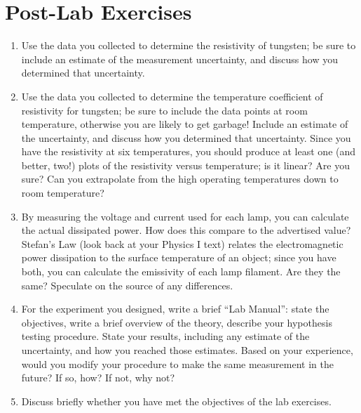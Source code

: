 \documentclass[12pt]{article}
\begin{document}
\section*{Post-Lab Exercises}

\begin{enumerate}
\item Use the data you collected to determine the resistivity of
  tungsten; be sure to include an estimate of the measurement
  uncertainty, and discuss how you determined that uncertainty.
\item Use the data you collected to determine the temperature
  coefficient of resistivity for tungsten; be sure to include the data
  points at room temperature, otherwise you are likely to get garbage!
  Include an estimate of the uncertainty, and discuss how you
  determined that uncertainty.  Since you have the resistivity at six
  temperatures, you should produce at least one (and better, two!)
  plots of the resistivity versus temperature; is it linear?  Are you
  sure?  Can you extrapolate from the high operating temperatures down
  to room temperature?
\item By measuring the voltage and current used for each lamp, you can
  calculate the actual dissipated power.  How does this compare to the
  advertised value?  Stefan's Law (look back at your Physics I text)
  relates the electromagnetic power dissipation to the surface
  temperature of an object; since you have both, you can calculate the
  emissivity of each lamp filament.  Are they the same?  Speculate on
  the source of any differences.
\item For the experiment you designed, write a brief ``Lab Manual'':
  state the objectives, write a brief overview of the theory, describe
  your hypothesis testing procedure.  State your results, including
  any estimate of the uncertainty, and how you reached those
  estimates.  Based on your experience, would you modify your
  procedure to make the same measurement in the future?  If so, how?
  If not, why not?
\item Discuss briefly whether you have met the objectives of the lab
  exercises. 
\end{enumerate}
\end{document}
